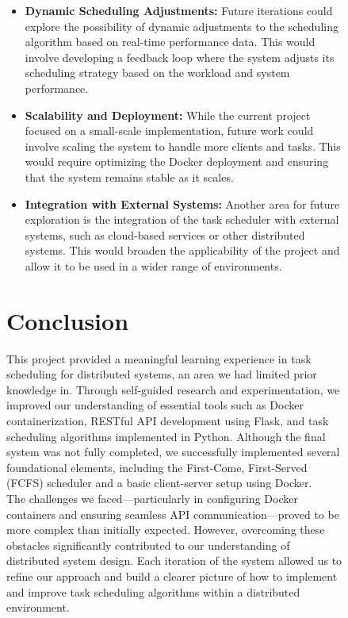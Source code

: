 \documentclass{article}
\begin{document}
\begin{figure}[h!]
\begin{itemize}
\item \textbf{Dynamic Scheduling Adjustments:} Future iterations could explore the possibility of dynamic adjustments to the scheduling algorithm based on real-time performance data. This would involve developing a feedback loop where the system adjusts its scheduling strategy based on the workload and system performance.

\item \textbf{Scalability and Deployment:} While the current project focused on a small-scale implementation, future work could involve scaling the system to handle more clients and tasks. This would require optimizing the Docker deployment and ensuring that the system remains stable as it scales.

\item \textbf{Integration with External Systems:} Another area for future exploration is the integration of the task scheduler with external systems, such as cloud-based services or other distributed systems. This would broaden the applicability of the project and allow it to be used in a wider range of environments.
\end{itemize}

\section{Conclusion}
This project provided a meaningful learning experience in task scheduling for distributed systems, an area we had limited prior knowledge in. Through self-guided research and experimentation, we improved our understanding of essential tools such as Docker containerization, RESTful API development using Flask, and task scheduling algorithms implemented in Python. Although the final system was not fully completed, we successfully implemented several foundational elements, including the First-Come, First-Served (FCFS) scheduler and a basic client-server setup using Docker.\\

The challenges we faced—particularly in configuring Docker containers and ensuring seamless API communication—proved to be more complex than initially expected. However, overcoming these obstacles significantly contributed to our understanding of distributed system design. Each iteration of the system allowed us to refine our approach and build a clearer picture of how to implement and improve task scheduling algorithms within a distributed environment.\\


\end{figure}
\end{document}
